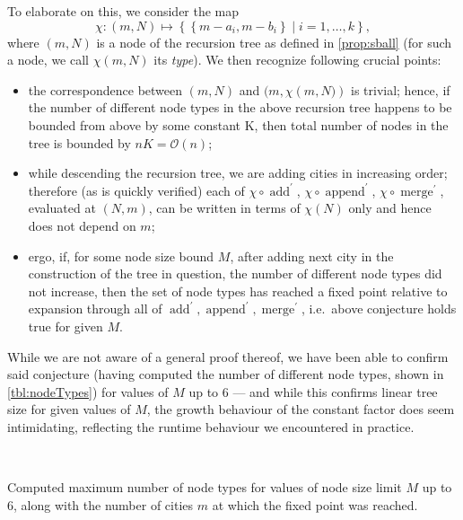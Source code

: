 \documentclass[titlepage,twoside,index=totoc,bibliography=totoc]{scrartcl}
\newcommand{\annotation}[1]{\marginpar{\small\itshape\color{green}#1}}
\numberwithin{equation}{section}
\numberwithin{figure}{section}
\numberwithin{table}{section}
\let\defstyle\itshape
\begin{document}
To elaborate on this, we consider the map
\[
  \chi : \left(m,N\right) \mapsto \left\{\left\{m-a_i,m-b_i\right\} \mid i = 1,\ldots,k \right\},
\]
where $\left(m,N\right)$ is a node of the recursion tree as defined in \cref{prop:sball}
(for such a node, we call $\chi\left(m,N\right)$ its {\defstyle type}).
We then recognize following crucial points:
\begin{itemize}
  \item
    the correspondence between $\left(m,N\right)$ and $(m,\chi\left(m,N)\right)$ is trivial;
    hence, if the number of different node types in the above recursion tree happens
    to be bounded from above by some constant K, then total number of nodes
    in the tree is bounded by $nK = \mathcal{O}\left(n\right)$;
  \item
    while descending the recursion tree, we are adding cities in increasing order;
    therefore (as is quickly verified) each of
    $\chi \circ \operatorname{add}^\prime$,
    $\chi \circ \operatorname{append}^\prime$,
    $\chi \circ \operatorname{merge}^\prime$,
    evaluated at $\left(N,m\right)$, can be written in terms of $\chi\left(N\right)$ only
    and hence does not depend on $m$;
  \item
    ergo, if, for some node size bound $M$, after adding next city in the
    construction of the tree in question, the number of different node
    types did not increase, then the set of node types has
    reached a fixed point relative to expansion through all of
    $\operatorname{add}^\prime, \operatorname{append}^\prime, \operatorname{merge}^\prime$,
    i.e.\ above conjecture holds true for given $M$.
\end{itemize}

While we are not aware of a general proof thereof, we have been able to confirm
said conjecture (having computed the number of different node types, shown
in \cref{tbl:nodeTypes}) for values of $M$ up to $6$ --- and while this
confirms linear tree size for given values of $M$, the growth behaviour of
the constant factor does seem intimidating, reflecting the runtime
behaviour we encountered in practice.

\begin{table}[htb]
\centering
    \mbox{%
    }
\caption{Computed maximum number of node types for values of node size limit $M$ up to $6$,
  along with the number of cities $m$ at which the fixed point was reached.}%
\label{tbl:nodeTypes}%
\end{table}
\end{document}
